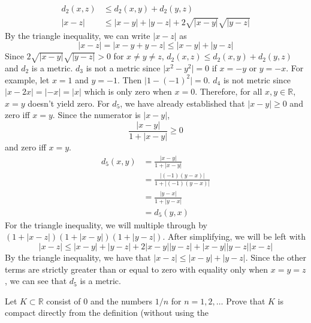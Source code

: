 \begin{exercise}
  \begin{align*}
    d_2(x, z) & \leq d_2(x, y) + d_2(y, z)\\
    \lvert x - z\rvert & \leq \lvert x - y\rvert + \lvert y - z\rvert +
                         2\sqrt{\lvert x - y\rvert}\sqrt{\lvert y - z\rvert}
  \end{align*}
  By the triangle inequality, we can write \(\lvert x - z\rvert\) as
  \[
  \lvert x - z\rvert = \lvert x - y + y - z\rvert\leq\lvert x - y\rvert +
  \lvert y - z\rvert
  \]
  Since \(2\sqrt{\lvert x - y\rvert}\sqrt{\lvert y - z\rvert} > 0\) for
  \(x\neq y\neq z\), \(d_2(x,z)\leq d_2(x,y) + d_2(y,z)\) and \(d_2\) is a
  metric.
  \(d_3\) is not a metric since \(\lvert x^2 - y^2\rvert = 0\) if \(x = -y\) or
  \(y = -x\).
  For example, let \(x = 1\) and \(y = -1\).
  Then \(\lvert 1 - (-1)^2\rvert = 0\).
  \(d_4\) is not metric since \(\lvert x - 2x\rvert = \lvert -x\rvert =
  \lvert x\rvert\) which is only zero when \(x = 0\).
  Therefore, for all \(x,y\in\mathbb{R}\), \(x = y\) doesn't yield zero.
  For \(d_5\), we have already established that \(\lvert x - y\rvert\geq 0\)
  and zero iff \(x = y\).
  Since the numerator is \(\lvert x - y\lvert\),
  \[
  \frac{\lvert x - y\rvert}{1 + \lvert x - y\rvert}\geq 0
  \]
  and zero iff \(x = y\).
  \begin{align*}
    d_5(x, y) & = \frac{\lvert x - y\rvert}{1 + \lvert x - y\rvert}\\
              & = \frac{\lvert (-1)(y - x)\rvert}
                {1 + \lvert (-1)(y - x)\rvert}\\
              & = \frac{\lvert y - x\rvert}{1 + \lvert y - x\rvert}\\
              & = d_5(y, x)
  \end{align*}
  For the triangle inequality, we will multiple through by
  \((1 + \lvert x - z\rvert)(1 + \lvert x - y\rvert)(1 + \lvert y - z\rvert)\).
  After simplifying, we will be left with
  \[
  \lvert x - z\rvert\leq\lvert x - y\rvert + \lvert y - z\rvert +
  2\lvert x - y\rvert\lvert y - z\rvert + \lvert x - y\rvert\lvert y - z\rvert
  \lvert x - z\rvert
  \]
  By the triangle inequality, we have that
  \(\lvert x - z\rvert\leq\lvert x - y\rvert + \lvert y - z\rvert\).
  Since the other terms are strictly greater than or equal to zero with
  equality only when \(x = y = z\), we can see that \(d_5\) is a metric.
\item
  Let \(K\subset\mathbb{R}\) consist of \(0\) and the numbers \(1/n\) for
  \(n = 1,2,\ldots\)
  Prove that \(K\) is compact directly from the definition (without using the

\end{exercise}
